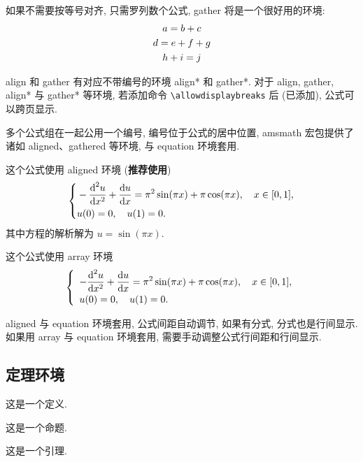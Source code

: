 如果不需要按等号对齐, 只需罗列数个公式, gather 将是一个很好用的环境:
\begin{gather}
a = b + c \\
d = e + f + g \notag \\
h + i = j
\end{gather}

align 和 gather 有对应不带编号的环境 align* 和 gather*.
对于 align, gather, align* 与 gather* 等环境, 若添加命令 \verb|\allowdisplaybreaks| 后 (已添加), 公式可以跨页显示.

多个公式组在一起公用一个编号, 编号位于公式的居中位置, amsmath 宏包提供了诸如 aligned、gathered 等环境, 与 equation 环境套用.

这个公式使用 aligned 环境 (\textbf{推荐使用})
\begin{equation}\label{eq:alignedEq}
\left\{\begin{aligned}
  &-\frac{{\mathop{}\!\mathrm{d}}^{2} u}{\mathop{}\!\mathrm{d} x^{2}}+\frac{\mathop{}\!\mathrm{d} u}{\mathop{}\!\mathrm{d} x}=\pi^{2} \sin (\pi x)+\pi \cos (\pi x),\quad x \in [0,1], \\
  &u(0)=0,\quad u(1)=0.
\end{aligned} \right.
\end{equation}
其中方程的解析解为 $u=\sin(\pi x)$.

这个公式使用 array 环境
\begin{equation}\label{eq:arrayEq}
\left\{\begin{array}{l}
\displaystyle
-\frac{{\mathop{}\!\mathrm{d}}^{2} u}{\mathop{}\!\mathrm{d} x^{2}}+\frac{\mathop{}\!\mathrm{d} u}{\mathop{}\!\mathrm{d} x}=\pi^{2} \sin (\pi x)+\pi \cos (\pi x),\quad x \in [0,1], \\[6pt]
u(0)=0,\quad u(1)=0.
\end{array} \right.
\end{equation}

aligned 与 equation 环境套用, 公式间距自动调节, 如果有分式, 分式也是行间显示. 如果用 array 与 equation 环境套用, 需要手动调整公式行间距和行间显示.


\subsection{定理环境}

\begin{definition}\label{def:foo}
这是一个定义.
\end{definition}

\begin{proposition}\label{prop:foo}
这是一个命题.
\end{proposition}

\begin{lemma}[Lemma]\label{lmm:foo}
这是一个引理.
\end{lemma}

